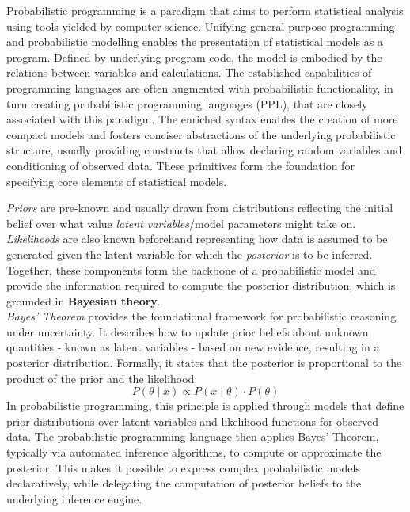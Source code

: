 Probabilistic programming is a paradigm that aims to perform statistical analysis using tools yielded by computer science.\cite{introductionprobabilisticprogramming}
Unifying general-purpose programming and probabilistic modelling enables the presentation of statistical models as a program. Defined by underlying program code, the model is
embodied by the relations between variables and calculations. The established capabilities of programming languages are often augmented with
probabilistic functionality, in turn creating probabilistic programming languages (PPL),\cite{probProgrammingPrinciples,2025modelcheckingprobabilisticoperator}
that are closely associated with this paradigm.
The enriched syntax enables the creation of more compact models and fosters conciser abstractions of the underlying probabilistic structure, usually providing constructs
that allow declaring random variables and conditioning of observed data. These primitives form the foundation for specifying core elements
of statistical models.

\textit{Priors} are pre-known and usually drawn from distributions reflecting the initial belief over what value
\textit{latent variables}/model parameters might take on. \textit{Likelihoods} are also known beforehand representing how data is assumed to be generated given the
latent variable for which the \textit{posterior} is to be inferred. Together, these components form the backbone of a probabilistic model and provide the information required
to compute the posterior distribution, which is grounded in \textbf{Bayesian theory}.\cite{introductionprobabilisticprogramming}
\\

\textit{Bayes’ Theorem} provides the foundational framework for probabilistic reasoning under uncertainty. It describes how to update prior beliefs about unknown
quantities - known as latent variables - based on new evidence, resulting in a posterior distribution. Formally, it states that the posterior is proportional to the
product of the prior and the likelihood:
\[
  P(\theta \mid x) \propto P(x \mid \theta) \cdot P(\theta)
\]
In probabilistic programming, this principle is applied through models that define prior distributions over latent variables and likelihood functions for
observed data. The probabilistic programming language then applies Bayes' Theorem, typically via automated inference algorithms, to compute or approximate the posterior.
This makes it possible to express complex probabilistic models declaratively, while delegating the computation of posterior beliefs to the underlying inference engine.
\\

